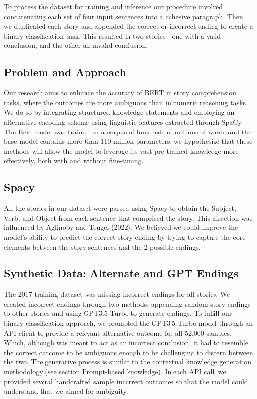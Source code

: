\documentclass{article}
\begin{document}
\begin{multicols}{2}
To process the dataset for training and inference our procedure involved concatenating each set of four input sentences into a cohesive paragraph. Then we duplicated each story and appended the correct or incorrect ending to create a binary classification task. This resulted in two stories—one with a valid conclusion, and the other an invalid conclusion.

\subsection{Problem and Approach}
Our research aims to enhance the accuracy of BERT in story comprehension tasks, where the outcomes are more ambiguous than in numeric reasoning tasks. We do so by integrating structured knowledge statements and employing an alternative encoding scheme using linguistic features extracted through SpaCy. The Bert model was trained on a corpus of hundreds of millions of words and the base model contains more than 110 million parameters; we hypothesize that these methods will allow the model to leverage its vast pre-trained knowledge more effectively, both with and without fine-tuning.

\subsection{Spacy}
All the stories in our dataset were parsed using Spacy to obtain the Subject, Verb, and Object from each sentence that comprised the story. This direction was influenced by Aglinoby and Teugel (2022). We believed we could improve the model’s ability to predict the correct story ending by trying to capture the core elements between the story sentences and the 2 possible endings.

\subsection{Synthetic Data: Alternate and GPT Endings}
The 2017 training dataset was missing incorrect endings for all stories. We created incorrect endings through two methods: appending random story endings to other stories and using GPT3.5 Turbo to generate endings. To fulfill our binary classification approach, we prompted the GPT3.5 Turbo model through an API client to provide a relevant alternative outcome for all 52,000 samples. Which, although was meant to act as an incorrect conclusion, it had to resemble the correct outcome to be ambiguous enough to be challenging to discern between the two. The generative process is similar to the contextual knowledge generation methodology (see section Prompt-based knowledge). In each API call, we provided several handcrafted sample incorrect outcomes so that the model could understand that we aimed for ambiguity.

\end{multicols}
\end{document}
